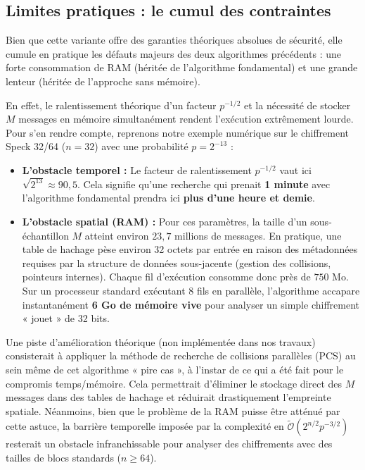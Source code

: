 \documentclass[a4paper,11pt]{article}
\begin{document}
\subsection{Limites pratiques : le cumul des contraintes}

Bien que cette variante offre des garanties théoriques absolues de sécurité, elle cumule en pratique les défauts majeurs des deux algorithmes précédents : une forte consommation de RAM (héritée de l'algorithme fondamental) et une grande lenteur (héritée de l'approche sans mémoire). 

En effet, le ralentissement théorique d'un facteur $p^{-1/2}$ et la nécessité de stocker $M$ messages en mémoire simultanément rendent l'exécution extrêmement lourde. Pour s'en rendre compte, reprenons notre exemple numérique sur le chiffrement Speck 32/64 ($n=32$) avec une probabilité $p = 2^{-13}$ :

\begin{itemize}
    \item \textbf{L'obstacle temporel :} Le facteur de ralentissement $p^{-1/2}$ vaut ici $\sqrt{2^{13}} \approx 90,5$. Cela signifie qu'une recherche qui prenait \textbf{1 minute} avec l'algorithme fondamental prendra ici \textbf{plus d'une heure et demie}.
    \item \textbf{L'obstacle spatial (RAM) :} Pour ces paramètres, la taille d'un sous-échantillon $M$ atteint environ $23,7$ millions de messages. En pratique, une table de hachage pèse environ 32 octets par entrée en raison des métadonnées requises par la structure de données sous-jacente (gestion des collisions, pointeurs internes). Chaque fil d'exécution consomme donc près de $750$ Mo. Sur un processeur standard exécutant 8 fils en parallèle, l'algorithme accapare instantanément \textbf{6 Go de mémoire vive} pour analyser un simple chiffrement « jouet » de 32 bits.
\end{itemize}

Une piste d'amélioration théorique (non implémentée dans nos travaux) consisterait à appliquer la méthode de recherche de collisions parallèles (PCS) au sein même de cet algorithme « pire cas », à l'instar de ce qui a été fait pour le compromis temps/mémoire. Cela permettrait d'éliminer le stockage direct des $M$ messages dans des tables de hachage et réduirait drastiquement l'empreinte spatiale. Néanmoins, bien que le problème de la RAM puisse être atténué par cette astuce, la barrière temporelle imposée par la complexité en $\tilde{\mathcal{O}}(2^{n/2} p^{-3/2})$ resterait un obstacle infranchissable pour analyser des chiffrements avec des tailles de blocs standards ($n \ge 64$).
\end{document}
